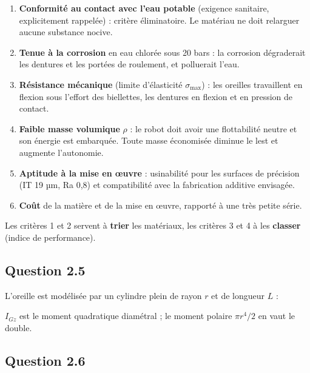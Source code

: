 \documentclass[11pt,a4paper]{article}
\providecommand{\tightlist}{\setlength{\itemsep}{0pt}\setlength{\parskip}{0pt}}
\newcommand{\equationajustee}[1]{%
  \sbox{\boiteequation}{$\displaystyle #1$}%
  \ifdim\wd\boiteequation>\linewidth
    \[\resizebox{\linewidth}{!}{\usebox{\boiteequation}}\]%
  \else
    \[#1\]%
  \fi}
\begin{document}
\begin{enumerate}
\def\labelenumi{\arabic{enumi}.}
\tightlist
\item
  \textbf{Conformité au contact avec l'eau potable} (exigence sanitaire, explicitement rappelée) : critère éliminatoire. Le matériau ne doit relarguer aucune substance nocive.
\item
  \textbf{Tenue à la corrosion} en eau chlorée sous 20 bars : la corrosion dégraderait les dentures et les portées de roulement, et polluerait l'eau.
\item
  \textbf{Résistance mécanique} (limite d'élasticité \(\sigma_{\max}\)) : les oreilles travaillent en flexion sous l'effort des biellettes, les dentures en flexion et en pression de contact.
\item
  \textbf{Faible masse volumique} \(\rho\) : le robot doit avoir une flottabilité neutre et son énergie est embarquée. Toute masse économisée diminue le lest et augmente l'autonomie.
\item
  \textbf{Aptitude à la mise en œuvre} : usinabilité pour les surfaces de précision (IT 19 µm, Ra 0,8) et compatibilité avec la fabrication additive envisagée.
\item
  \textbf{Coût} de la matière et de la mise en œuvre, rapporté à une très petite série.
\end{enumerate}

Les critères 1 et 2 servent à \textbf{trier} les matériaux, les critères 3 et 4 à les \textbf{classer} (indice de performance).

\hypertarget{question-2.5}{%
\subsection{Question 2.5}\label{question-2.5}}

L'oreille est modélisée par un cylindre plein de rayon \(r\) et de longueur \(L\) :

\equationajustee{\boxed{m = \rho\,\pi\,r^2\,L}}

\equationajustee{\begin{aligned}
I_{Gz} &= \iint_S y^2\,\mathrm{d}S \\
&= \frac{\pi\,r^4}{4}
\end{aligned}}

\equationajustee{\boxed{I_{Gz} = \frac{\pi\,r^4}{4}}}

\(I_{Gz}\) est le moment quadratique diamétral ; le moment polaire \(\pi r^4/2\) en vaut le double.

\hypertarget{question-2.6}{%
\subsection{Question 2.6}\label{question-2.6}}
\end{document}

